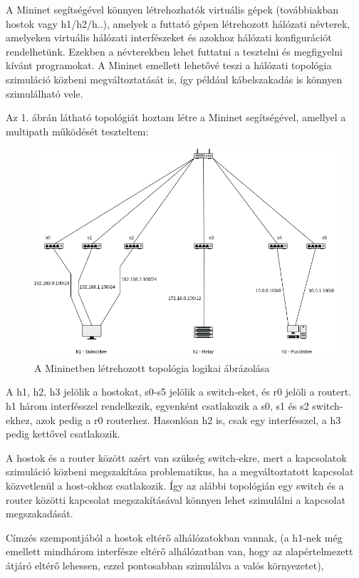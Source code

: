 \documentclass[a4paper,oneside]{article}
\begin{document}
A Mininet segítségével könnyen létrehozhatók virtuális gépek (továbbiakban hostok vagy h1/h2/h..), 
amelyek a futtató gépen létrehozott hálózati névterek, amelyeken virtuális
hálózati interfészeket és azokhoz hálózati konfigurációt rendelhetünk.
Ezekben a névterekben lehet futtatni a tesztelni és megfigyelni kívánt programokat.
A Mininet emellett lehetővé teszi a hálózati topológia 
szimuláció közbeni megváltoztatását is, így például kábelszakadás 
is könnyen szimulálható vele. \cite{mininet}

Az 1. ábrán látható topológiát hoztam létre a Mininet segítségével, amellyel a multipath működését teszteltem:

\begin{figure}[h]
  \centering
    \includegraphics[width=15cm]{topo1}
\caption{A Mininetben létrehozott topológia logikai ábrázolása}
\end{figure}
 
A h1, h2, h3 jelölik a hostokat, s0-s5 jelölik a switch-eket, és r0 jelöli a routert.
h1 három interfésszel rendelkezik, egyenként csatlakozik a s0, s1 és s2 switch-ekhez, azok pedig a r0 routerhez.
Hasonlóan h2 is, csak egy interfésszel, a h3 pedig kettővel csatlakozik.

A hostok és a router között azért van szükség switch-ekre,
mert a kapcsolatok szimuláció közbeni megszakítása problematikus, ha a megváltoztatott kapcsolat közvetlenül a host-okhoz csatlakozik.
Így az alábbi topológián egy switch és a router közötti kapcsolat megszakításával könnyen lehet szimulálni a kapcsolat megszakadását.

Címzés szempontjából a hostok eltérő alhálózatokban vannak, (a h1-nek még emellett 
mindhárom interfésze eltérő alhálózatban van, hogy az alapértelmezett átjáró eltérő lehessen, ezzel pontosabban szimulálva a valós környezetet),
\end{document}
